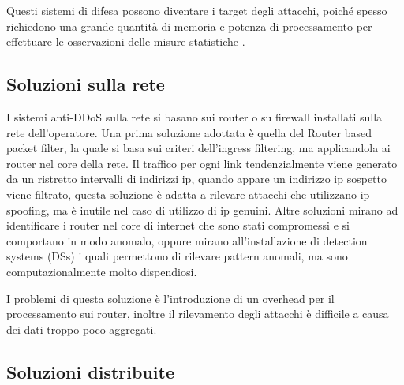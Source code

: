 
Questi sistemi di difesa possono diventare i target degli attacchi, poiché spesso richiedono una grande quantità di memoria e potenza di processamento per effettuare le osservazioni delle misure statistiche \cite{ddos_survey_4}.

\subsection{Soluzioni sulla rete}

I sistemi anti-DDoS sulla rete si basano sui router o su firewall installati sulla rete dell'operatore.
Una prima soluzione adottata è quella del Router based packet filter, la quale si basa sui criteri dell'ingress filtering, ma applicandola ai router nel core della rete. Il traffico per ogni link tendenzialmente viene generato da un ristretto intervalli di indirizzi ip, quando appare un indirizzo ip sospetto viene filtrato, questa soluzione è adatta a rilevare attacchi che utilizzano ip spoofing, ma è inutile nel caso di utilizzo di ip genuini.
Altre soluzioni mirano ad identificare i router nel core di internet che sono stati compromessi e si comportano in modo anomalo, oppure mirano all'installazione di detection systems (DSs) i quali permettono di rilevare pattern anomali, ma sono computazionalmente molto dispendiosi.

I problemi di questa soluzione è l'introduzione di un overhead per il processamento sui router, inoltre il rilevamento degli attacchi è difficile a causa dei dati troppo poco aggregati.

\subsection{Soluzioni distribuite}

